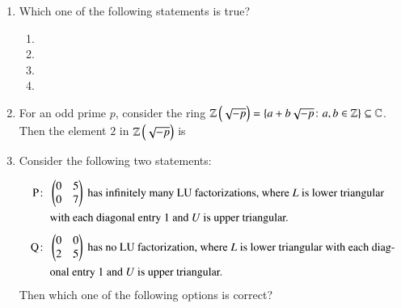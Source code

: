 \documentclass[journal,12pt,onecolumn]{IEEEtran}
\theoremstyle{remark}
\begin{document}
\begin{enumerate}[start=10]
\item Which one of the following statements is true? 

\hfill{}
\begin{enumerate}
\item {}
\item {}
\item {}
\item {}
\end{enumerate}

\item For an odd prime $p$, consider the ring $\mathbb{Z}\left(\sqrt{-p}\right) = \{a + b\sqrt{-p} \colon a, b \in \mathbb{Z}\} \subseteq \mathbb{C}$. Then the
element $2$ in $\mathbb{Z}\left(\sqrt{-p}\right)$ is 

\hfill{}
\begin{enumerate}
\end{enumerate}
\newpage
\item Consider the following two statements:

\hfill{}
\begin{align*}
\text{P}\colon &\ \begin{pmatrix}0 & 5\\ 0 & 7\end{pmatrix}\ \text{has infinitely many LU factorizations, where $L$ is lower triangular}\\
&\ \text{with each diagonal entry $1$ and $U$ is upper triangular.}\\[4pt]
\text{Q}\colon &\ \begin{pmatrix}0 & 0\\ 2 & 5\end{pmatrix}\ \text{has no LU factorization, where $L$ is lower triangular with each diag-}\\
&\ \text{onal entry $1$ and $U$ is upper triangular.}
\end{align*}
Then which one of the following options is correct?
\begin{enumerate}
\end{enumerate}


\end{enumerate}
\end{document}
